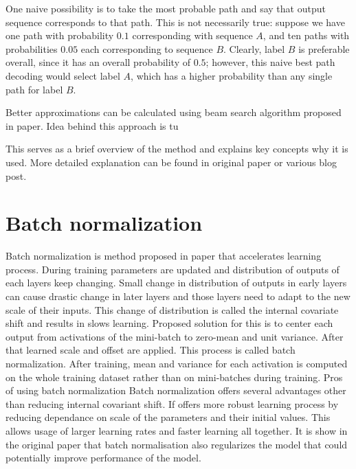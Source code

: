 \documentclass[times, utf8, diplomski, numeric, english]{fer}
\begin{document}
One naive possibility is to take the most probable path and say that output sequence corresponds to that path.
This is not necessarily true: suppose we have one path with probability $0.1$ corresponding with sequence $A$, and ten paths with probabilities  $0.05$ each corresponding to sequence $B$. Clearly, label $B$ is preferable overall, since it has an overall probability of $0.5$; however, this naive best path decoding would select label $A$, which has a higher probability than any single path for label $B$.

Better approximations can be calculated using beam search algorithm proposed in paper\cite{graves_decode}.  
Idea behind this approach is tu 

This serves as a brief overview of the method and explains key concepts why it is used. More detailed explanation can be found in original paper\cite{Graves:2006:CTC:1143844.1143891} or various blog post\cite{ctc-blog}.

\section{Batch normalization}
Batch normalization is method proposed in paper\cite{BNORM} that accelerates learning process. 
During training parameters are updated and distribution of outputs of each layers keep changing. Small change in distribution of outputs in early layers can cause drastic change in later layers and those layers need to adapt to the new scale of their inputs. This change of distribution is called the internal covariate shift and results in slows learning.
Proposed solution for this is to center each output from activations of the mini-batch to zero-mean and unit variance. After that learned scale and offset are applied. This process is called batch normalization. 
After training, mean and variance for each activation is computed on the whole training dataset rather than on mini-batches during training. 
Pros of using batch normalization 
Batch normalization offers several advantages other than reducing internal covariant shift. 
If offers more robust learning process by reducing dependance on scale of the parameters and their initial values. This allows usage of larger learning rates and faster learning all together. It is show in the original paper that batch normalisation also regularizes the model that could potentially improve performance of the model.

\end{document}

